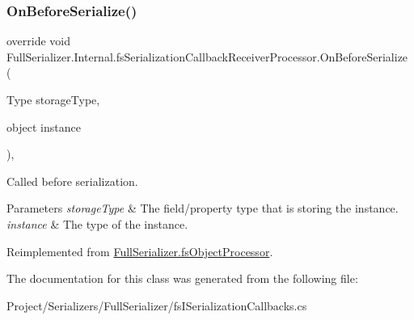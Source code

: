 \subsubsection{\texorpdfstring{On\+Before\+Serialize()}{OnBeforeSerialize()}}
{\footnotesize\ttfamily override void Full\+Serializer.\+Internal.\+fs\+Serialization\+Callback\+Receiver\+Processor.\+On\+Before\+Serialize (\begin{DoxyParamCaption}\item[{Type}]{storage\+Type,  }\item[{object}]{instance }\end{DoxyParamCaption})\hspace{0.3cm}{\ttfamily [inline]}, {\ttfamily [virtual]}}



Called before serialization. 


\begin{DoxyParams}{Parameters}
{\em storage\+Type} & The field/property type that is storing the instance.\\
\hline
{\em instance} & The type of the instance.\\
\hline
\end{DoxyParams}


Reimplemented from \hyperlink{class_full_serializer_1_1fs_object_processor_a48818569c78a826069594fb5ce6e32f2}{Full\+Serializer.\+fs\+Object\+Processor}.



The documentation for this class was generated from the following file\+:\begin{DoxyCompactItemize}
\item 
Project/\+Serializers/\+Full\+Serializer/fs\+I\+Serialization\+Callbacks.\+cs\end{DoxyCompactItemize}
